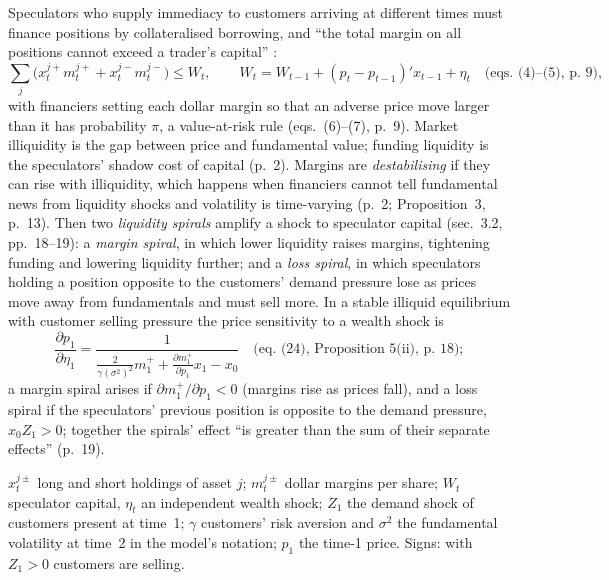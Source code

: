 \begin{qfmodel}\label{mod:margin-liquidity-spiral}
 Speculators who supply immediacy to customers arriving at different times must finance positions by collateralised borrowing, and ``the total margin on all positions cannot exceed a trader's capital'' \citep[RFS Advance Access version of 10 December 2008, p.~1]{exp-brunnermeier-pedersen-liquidity}:
\[ \sum_j\big(x_t^{j+}m_t^{j+}+x_t^{j-}m_t^{j-}\big)\le W_t, \qquad W_t=W_{t-1}+(p_t-p_{t-1})'x_{t-1}+\eta_t \quad\text{(eqs.~(4)--(5), p.~9)}, \]
with financiers setting each dollar margin so that an adverse price move larger than it has probability $\pi$, a value-at-risk rule (eqs.~(6)--(7), p.~9). Market illiquidity is the gap between price and fundamental value; funding liquidity is the speculators' shadow cost of capital (p.~2). Margins are \emph{destabilising} if they can rise with illiquidity, which happens when financiers cannot tell fundamental news from liquidity shocks and volatility is time-varying (p.~2; Proposition~3, p.~13). Then two \emph{liquidity spirals} amplify a shock to speculator capital (sec.~3.2, pp.~18--19): a \emph{margin spiral}, in which lower liquidity raises margins, tightening funding and lowering liquidity further; and a \emph{loss spiral}, in which speculators holding a position opposite to the customers' demand pressure lose as prices move away from fundamentals and must sell more. In a stable illiquid equilibrium with customer selling pressure the price sensitivity to a wealth shock is
\[ \frac{\partial p_1}{\partial\eta_1}=\frac{1}{\frac{2}{\gamma(\sigma^2)^2}m_1^+ +\frac{\partial m_1^+}{\partial p_1}x_1-x_0}\quad\text{(eq.~(24), Proposition~5(ii), p.~18)}; \]
a margin spiral arises if $\partial m_1^+/\partial p_1<0$ (margins rise as prices fall), and a loss spiral if the speculators' previous position is opposite to the demand pressure, $x_0Z_1>0$; together the spirals' effect ``is greater than the sum of their separate effects'' (p.~19).

 $x_t^{j\pm}$ long and short holdings of asset $j$; $m_t^{j\pm}$ dollar margins per share; $W_t$ speculator capital, $\eta_t$ an independent wealth shock; $Z_1$ the demand shock of customers present at time~1; $\gamma$ customers' risk aversion and $\sigma^2$ the fundamental volatility at time~2 in the model's notation; $p_1$ the time-1 price. Signs: with $Z_1>0$ customers are selling.


\end{qfmodel}
